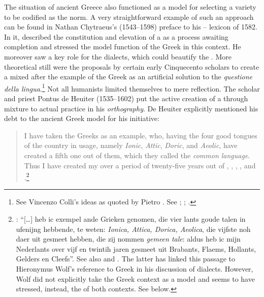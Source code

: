 The situation of ancient Greece also functioned as a model for selecting a variety to be codified as the  norm. A very straightforward example of such an approach can be found in Nathan Chytraeus’s (1543–1598) preface to his – lexicon of 1582. In it, \citet[\textsc{a.3}\textsc{\textsuperscript{r}}\textsc{–a.3}\textsc{\textsuperscript{v}}]{Chytraeus1582} described the constitution and elevation of a   as a process awaiting completion and stressed the model function of the Greek  in this context. He moreover saw a key role for the dialects, which could beautify the . More theoretical still were the proposals by certain early Cinquecento  scholars to create a mixed  after the example of the Greek  as an artificial solution to the \textit{questione della lingua}.\footnote{See Vincenzo Colli’s ideas as quoted by Pietro \citet[\textsc{xii}\textsc{\textsuperscript{v}}\textsc{–xiii}\textsc{\textsuperscript{r}}]{Bembo1525}. See \citet[119]{Melzi1966}; \citet[215--218]{Trovato1984}; \citet[12]{Trapp1990}.} Not all humanists limited themselves to mere reflection. The  scholar and priest Pontus de Heuiter (1535–1602) put the active creation of a   through mixture to actual practice in his \textit{ orthography}. De Heuiter explicitly mentioned his debt to the ancient Greek model for his initiative:

\begin{quote}
I have taken the Greeks as an example, who, having the four good tongues of the country in usage, namely \textit{Ionic}, \textit{Attic}, \textit{Doric}, and \textit{Aeolic}, have created a fifth one out of them, which they called the \textit{common language}. Thus I have created my  over a period of twenty-five years out of , , , , and .\footnote{: “[…] heb ic exempel ande Grieken genomen, die vier lants goude talen in ufenijng hebbende, te weten: \textit{Ionica, Attica, Dorica, Aeolica}, die vijfste noh daer uit gesmeet hebben, die zij nommen \textit{gemeen tale}: aldus heb ic mijn Nederlants over vijf en twintih jaren gesmeet uit Brabants, Flaems, Hollants, Gelders en Cleefs”. See also \citet[110]{Dibbets2008} and \citet[13--14]{De1917}. The latter has linked this passage to Hieronymus Wolf’s reference to Greek in his discussion of  dialects. However, Wolf did not explicitly take the Greek context as a model and seems to have stressed, instead, the  of both contexts. See  below.}
\end{quote}

